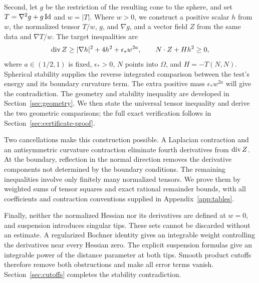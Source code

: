 Second, let $g$ be the restriction of the resulting cone to the sphere,
and set $T=\nabla^2g+g\operatorname{Id}$ and $w=|T|$.  Where $w>0$, we construct
a positive scalar $h$ from $w$, the normalized tensor $T/w$, $g$,
and $\nabla g$, and
a vector field $Z$ from the same data and $\nabla T/w$.  The target
inequalities are
\[
  \operatorname{div} Z\ge |\nabla h|^2+4h^2+\epsilon_*w^{2a},
  \qquad N\cdot Z+Hh^2\ge0,
\]
where $a\in(1/2,1)$ is fixed, $\epsilon_*>0$, $N$ points into $\Omega$, and
$H=-T(N,N)$.  Spherical stability supplies the reverse integrated
comparison between the test's energy and its boundary curvature term.
The extra positive mass $\epsilon_*w^{2a}$ will give the contradiction.
The geometry and stability inequality are developed in
Section~\ref{sec:geometry}. We then state the universal tensor inequality
and derive the two geometric comparisons; the full exact verification
follows in Section~\ref{sec:certificate-proof}.

Two cancellations make this construction possible.  A Laplacian
contraction and an antisymmetric curvature contraction eliminate
fourth derivatives from $\operatorname{div} Z$.  At the boundary, reflection
in the normal direction removes the derivative components not
determined by the boundary conditions.  The remaining inequalities
involve only finitely many normalized tensors.  We prove them by
weighted sums of tensor squares and exact rational remainder bounds,
with all coefficients and contraction conventions supplied in
Appendix~\ref{app:tables}.

Finally, neither the normalized Hessian nor its derivatives are defined
at $w=0$, and suspension introduces singular tips.  These sets cannot
be discarded without an estimate.  A regularized Bochner identity
gives an integrable weight controlling the derivatives near every
Hessian zero.  The explicit suspension formulas give an integrable
power of the distance parameter at both tips.  Smooth product
cutoffs therefore remove both obstructions and make all error terms
vanish.  Section~\ref{sec:cutoffs} completes the stability
contradiction.
